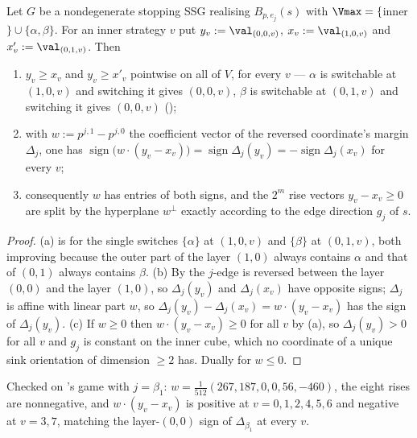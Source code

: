 \begin{lemma}\label{b3:rise-sign}
Let $G$ be a nondegenerate stopping SSG realising $B_{p,e_j}(s)$ with
$\Vmax=\{$inner$\}\cup\{\alpha,\beta\}$. For an inner strategy $v$ put
$y_v:=\val_{(0,0,v)}$, $x_v:=\val_{(1,0,v)}$ and $x'_v:=\val_{(0,1,v)}$. Then
\begin{enumerate}[label=(\alph*),leftmargin=2.2em]
\item $y_v\ge x_v$ and $y_v\ge x'_v$ pointwise on all of $V$, for every $v$ ---
      $\alpha$ is switchable at $(1,0,v)$ and switching it gives $(0,0,v)$,
      $\beta$ is switchable at $(0,1,v)$ and switching it gives $(0,0,v)$
      ();
\item with $w:=p^{j,1}-p^{j,0}$ the coefficient vector of the reversed
      coordinate's margin $\Delta_j$, one has
      $\operatorname{sign}\bigl(w\cdot(y_v-x_v)\bigr)
      =\operatorname{sign}\Delta_j(y_v)=-\operatorname{sign}\Delta_j(x_v)$ for
      every $v$;
\item consequently $w$ has entries of both signs, and the $2^{m}$ rise vectors
      $y_v-x_v\ge0$ are split by the hyperplane $w^{\perp}$ exactly according
      to the edge direction $g_j$ of $s$.
\end{enumerate}
\end{lemma}

\begin{proof}
(a) is  for the single switches $\{\alpha\}$ at $(1,0,v)$ and
$\{\beta\}$ at $(0,1,v)$, both improving because the outer part of the layer
$(1,0)$ always contains $\alpha$ and that of $(0,1)$ always contains $\beta$.
(b) By  the $j$-edge is reversed between
the layer $(0,0)$ and the layer $(1,0)$, so $\Delta_j(y_v)$ and $\Delta_j(x_v)$
have opposite signs; $\Delta_j$ is affine with linear part $w$, so
$\Delta_j(y_v)-\Delta_j(x_v)=w\cdot(y_v-x_v)$ has the sign of $\Delta_j(y_v)$.
(c) If $w\ge0$ then $w\cdot(y_v-x_v)\ge0$ for all $v$ by (a), so $\Delta_j(y_v)>0$
for all $v$ and $g_j$ is constant on the inner cube, which no coordinate of a
unique sink orientation of dimension $\ge2$ has. Dually for $w\le0$.
\end{proof}

\begin{remark}
Checked on 's game with $j=\beta_1$: $w=\tfrac1{512}
(267,187,0,0,56,-460)$, the eight rises are nonnegative, and
$w\cdot(y_v-x_v)$ is positive at $v=0,1,2,4,5,6$ and negative at $v=3,7$,
matching the layer-$(0,0)$ sign of $\Delta_{\beta_1}$ at every $v$.
\end{remark}

